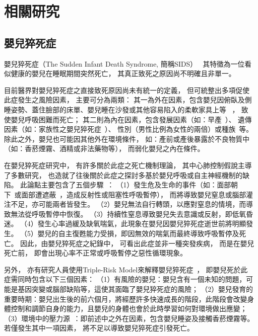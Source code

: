\documentclass[class=NCU_thesis, crop=false]{standalone}
\begin{document}
\chapter{相關研究}

\section{嬰兒猝死症}
嬰兒猝死症（The Sudden Infant Death Syndrome, 簡稱SIDS）~\cite{kinney_sudden_2009}
其特徵為一位看似健康的嬰兒在睡眠期間突然死亡，
其真正致死之原因尚不明確且非單一。

目前醫界對嬰兒猝死症之直接致死原因尚未有統一的定義，
但可統整出多項促使此症發生之風險因素，
主要可分為兩類：
其一為外在因素，包含嬰兒因俯臥及側睡姿勢、蓋住臉部的床單、嬰兒睡在沙發或其他容易陷入的柔軟家具上等
~\cite{willinger_infant_1994, mitchell_reduction_1994, iyasu_risk_2002, kemp_unsafe_2000, ponsonby_factors_1993}，
致使嬰兒呼吸困難而死亡；
其二則為內在因素，包含發展因素（如：早產~\cite{horne_effects_2006}）、
遺傳因素（如：家族性之嬰兒猝死症~\cite{ce_sudden_2001, oyen_population-based_1996}）、
性別（男性比例為女性的兩倍）或種族~\cite{hauck_sleep_2003}等。
除此之外，嬰兒也可能因其他外在環境條件，
如：產前或產後暴露於不良物質中（如：香菸煙霧、酒精或非法藥物等），
而弱化嬰兒之內在條件。

在嬰兒猝死症研究中，
有許多關於此症之死亡機制理論，
其中心肺控制假說主導了多數研究，
也造就了往後關於此症之探討多基於嬰兒呼吸或自主神經機制的缺陷。
此論點主要包含了五個步驟~\cite{kinney_sudden_2009}：
（1）發生危及生命的事件（如：面部朝下~\cite{kemp_sudden_1991}或面部遭遮蔽~\cite{skadberg_consequences_1997}，造成反射性或阻塞性呼吸暫停），
而將導致嬰兒窒息或腦部灌注不足，亦可能兩者皆發生。
（2）嬰兒無法自行轉頭，以應對窒息的情境，而導致無法從呼吸暫停中恢復。
（3）持續性窒息導致嬰兒失去意識或反射，即低氧昏迷。
（4）發生心率過緩及缺氧喘氣，此現象在嬰兒因嬰兒猝死症逝世前將明顯發生。
（5）嬰兒的自主復甦能力受損，即因無效的喘氣而最終導致呼吸暫停及死亡。
因此，由嬰兒猝死症之紀錄中，
可看出此症並非一種突發疾病，
而是在嬰兒死亡前，
即會出現心率不正常或呼吸暫停之惡性循環現象。

另外，
亦有研究人員使用Triple-Risk Model來解釋嬰兒猝死症~\cite{noauthor_what_nodate}，
即嬰兒死於此症需同時包含以下三個因素：
（1）有風險的嬰兒：嬰兒含有一個未知的問題，可能是基因突變或腦部缺陷等，這使其面臨了嬰兒猝死症的風險；
（2）嬰兒發育的重要時期：嬰兒出生後的前六個月，將經歷許多快速成長的階段，此階段會改變身體控制和調節自身的能力，且嬰兒的身體也會於此時學習如何對環境做出應變；
（3）環境中的壓力源~\cite{moon_sids_2011}：即前述中之外在因素，包含嬰兒睡姿及接觸香菸煙霧等。
若僅發生其中一項因素，
將不足以導致嬰兒猝死症引發死亡。
\end{document}
